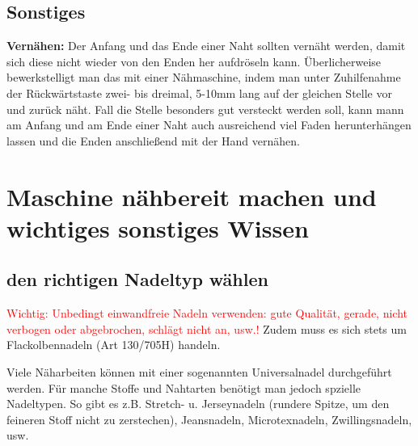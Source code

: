 \documentclass{\basedir/fablab-document}
\begin{document}
\subsection{Sonstiges}
\textbf{Vernähen:} 
\newline
Der Anfang und das Ende einer Naht sollten vernäht werden, damit sich diese nicht wieder von den Enden her aufdröseln kann.
Überlicherweise bewerkstelligt man das mit einer Nähmaschine, indem man unter Zuhilfenahme der Rückwärtstaste zwei- bis dreimal, 5-10mm lang auf der gleichen Stelle vor und zurück näht.
Fall die Stelle besonders gut versteckt werden soll, kann mann am Anfang und am Ende einer Naht auch ausreichend viel Faden herunterhängen lassen und die Enden anschließend mit der Hand vernähen.

\pagebreak
\section{Maschine nähbereit machen und wichtiges sonstiges Wissen}

\subsection{den richtigen Nadeltyp wählen}
\textcolor{red}{Wichtig: Unbedingt einwandfreie Nadeln verwenden: gute Qualität, gerade, nicht verbogen oder abgebrochen, schlägt nicht an, usw.!}
Zudem muss es sich stets um Flackolbennadeln (Art 130/705H) handeln.
\newline


Viele Näharbeiten können mit einer sogenannten Universalnadel durchgeführt werden. Für manche Stoffe und Nahtarten benötigt man jedoch spzielle Nadeltypen.
So gibt es z.B. Stretch- u. Jerseynadeln (rundere Spitze, um den feineren Stoff nicht zu zerstechen), Jeansnadeln, Microtexnadeln, Zwillingsnadeln, usw. 
\newline
\end{document}
